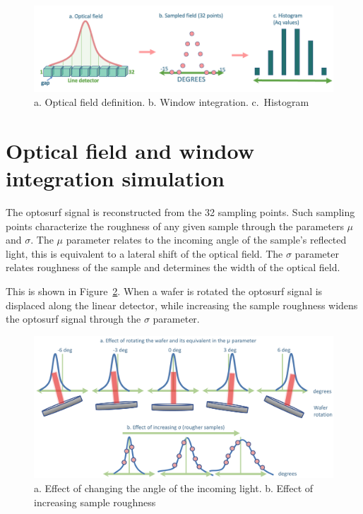 \documentclass[
  letterpaper,
  DIV=11,
  numbers=noendperiod,
  oneside]{scrreprt}
\begin{document}
\begin{figure}

{\centering \includegraphics{notebooks/figures/a/fig_1_optical_field.png}

}

\caption{\label{fig-2-1}a. Optical field definition. b. Window
integration. c.~Histogram}

\end{figure}

\hypertarget{optical-field-and-window-integration-simulation}{%
\section{Optical field and window integration
simulation}\label{optical-field-and-window-integration-simulation}}

The optosurf signal is reconstructed from the 32 sampling points. Such
sampling points characterize the roughness of any given sample through
the parameters \(\mu\) and \(\sigma\). The \(\mu\) parameter relates to
the incoming angle of the sample's reflected light, this is equivalent
to a lateral shift of the optical field. The \(\sigma\) parameter
relates roughness of the sample and determines the width of the optical
field.

This is shown in Figure~\ref{fig-2-2}. When a wafer is rotated the
optosurf signal is displaced along the linear detector, while increasing
the sample roughness widens the optosurf signal through the \(\sigma\)
parameter.

\begin{figure}

{\centering \includegraphics{notebooks/figures/a/fig_2_wafer_rotation.png}

}

\caption{\label{fig-2-2}a. Effect of changing the angle of the incoming
light. b. Effect of increasing sample roughness}

\end{figure}
\end{document}
